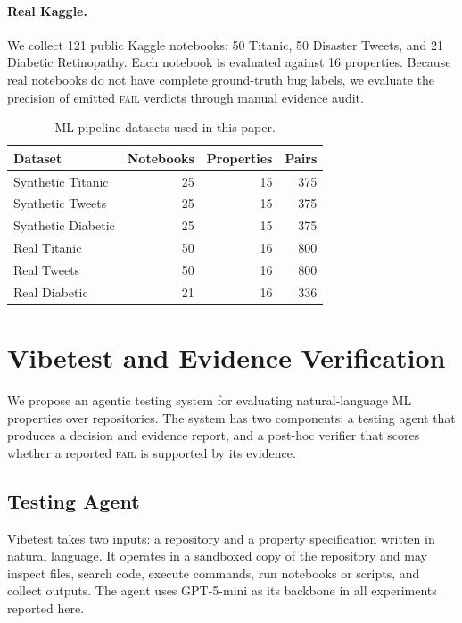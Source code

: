\documentclass[11pt]{article}
\begin{document}
\paragraph{Real Kaggle.}
We collect 121 public Kaggle notebooks: 50 Titanic, 50 Disaster Tweets, and 21 Diabetic Retinopathy.
Each notebook is evaluated against 16 properties.
Because real notebooks do not have complete ground-truth bug labels, we evaluate the precision of emitted \textsc{fail} verdicts through manual evidence audit.

\begin{table}[t]
  \centering
  \small
  \caption{ML-pipeline datasets used in this paper.}
  \label{tab:datasets}
  \begin{tabular}{lrrr}
    \toprule
    Dataset & Notebooks & Properties & Pairs \\
    \midrule
    Synthetic Titanic & 25 & 15 & 375 \\
    Synthetic Tweets & 25 & 15 & 375 \\
    Synthetic Diabetic & 25 & 15 & 375 \\
    \midrule
    Real Titanic & 50 & 16 & 800 \\
    Real Tweets & 50 & 16 & 800 \\
    Real Diabetic & 21 & 16 & 336 \\
    \bottomrule
  \end{tabular}
\end{table}

\section{Vibetest and Evidence Verification}
\label{sec:method}

We propose an agentic testing system for evaluating natural-language ML properties over repositories.
The system has two components: a testing agent that produces a decision and evidence report, and a post-hoc verifier that scores whether a reported \textsc{fail} is supported by its evidence.

\subsection{Testing Agent}

Vibetest takes two inputs: a repository and a property specification written in natural language.
It operates in a sandboxed copy of the repository and may inspect files, search code, execute commands, run notebooks or scripts, and collect outputs.
The agent uses GPT-5-mini as its backbone in all experiments reported here.
\end{document}
